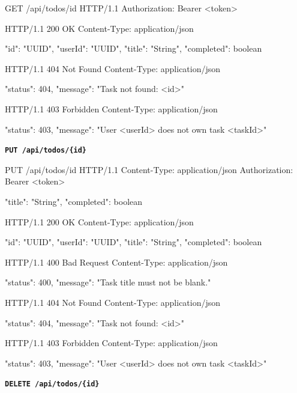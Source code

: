\begin{httpexchange}
\begin{httplisting}
GET /api/todos/{id} HTTP/1.1
Authorization: Bearer <token>
\end{httplisting}
\httpmidarrows
\begin{httplisting}
HTTP/1.1 200 OK
Content-Type: application/json

{
    "id": "UUID",
    "userId": "UUID",
    "title": "String",
    "completed": boolean
}

HTTP/1.1 404 Not Found
Content-Type: application/json

{
    "status": 404,
    "message": "Task not found: <id>"
}

HTTP/1.1 403 Forbidden
Content-Type: application/json

{
    "status": 403,
    "message": "User <userId> does not own task <taskId>"
}
\end{httplisting}
\end{httpexchange}


\newpage


\textbf{\texttt{PUT /api/todos/\{id\}}}

\begin{httpexchange}
\begin{httplisting}
PUT /api/todos/{id} HTTP/1.1
Content-Type: application/json
Authorization: Bearer <token>

{
    "title": "String",
    "completed": boolean
}
\end{httplisting}
\httpmidarrows
\begin{httplisting}
HTTP/1.1 200 OK
Content-Type: application/json

{
    "id": "UUID",
    "userId": "UUID",
    "title": "String",
    "completed": boolean
}

HTTP/1.1 400 Bad Request
Content-Type: application/json

{
    "status": 400,
    "message": "Task title must not be blank."
}

HTTP/1.1 404 Not Found
Content-Type: application/json

{
    "status": 404,
    "message": "Task not found: <id>"
}

HTTP/1.1 403 Forbidden
Content-Type: application/json

{
    "status": 403,
    "message": "User <userId> does not own task <taskId>"
}
\end{httplisting}
\end{httpexchange}


\textbf{\texttt{DELETE /api/todos/\{id\}}}


